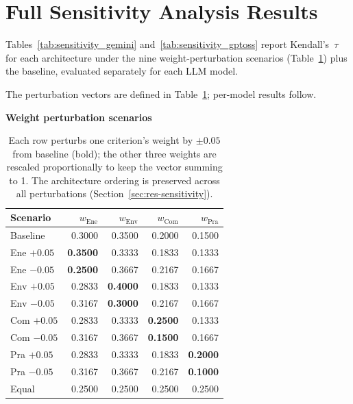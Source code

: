 \documentclass[final,3p,times]{elsarticle}
\begin{document}
\section{Full Sensitivity Analysis Results}
\label{app:sensitivity_full}

Tables~\ref{tab:sensitivity_gemini} and~\ref{tab:sensitivity_gptoss} report
Kendall's~$\tau$ for each architecture under the nine weight-perturbation
scenarios (Table~\ref{tab:sensitivity_weights}) plus the baseline,
evaluated separately for each LLM model.

The perturbation vectors are defined in Table~\ref{tab:sensitivity_weights}; per-model results follow.

\begin{table}[htbp]
\begin{threeparttable}
\centering
\small
\textbf{Weight perturbation scenarios}
\caption{Each row perturbs one criterion's weight by $\pm0.05$ from baseline (bold); the other three weights are rescaled proportionally to keep the vector summing to 1. The architecture ordering is preserved across all perturbations (Section~\ref{sec:res-sensitivity}).}
\label{tab:sensitivity_weights}
\begin{tabular}{@{} l r r r r @{}}
\toprule
\textbf{Scenario} & $w_{\text{Ene}}$ & $w_{\text{Env}}$ & $w_{\text{Com}}$ & $w_{\text{Pra}}$ \\
\midrule
Baseline          & 0.3000 & 0.3500 & 0.2000 & 0.1500 \\
\midrule
Ene $+0.05$       & \textbf{0.3500} & 0.3333  & 0.1833  & 0.1333 \\
Ene $-0.05$       & \textbf{0.2500}  & 0.3667 & 0.2167 & 0.1667 \\
\midrule
Env $+0.05$       & 0.2833  & \textbf{0.4000} & 0.1833  & 0.1333 \\
Env $-0.05$       & 0.3167 & \textbf{0.3000}  & 0.2167 & 0.1667 \\
\midrule
Com $+0.05$       & 0.2833  & 0.3333  & \textbf{0.2500} & 0.1333 \\
Com $-0.05$       & 0.3167 & 0.3667 & \textbf{0.1500}  & 0.1667 \\
\midrule
Pra $+0.05$       & 0.2833  & 0.3333  & 0.1833  & \textbf{0.2000} \\
Pra $-0.05$       & 0.3167 & 0.3667 & 0.2167 & \textbf{0.1000} \\
\midrule
Equal             & 0.2500  & 0.2500  & 0.2500 & 0.2500 \\
\bottomrule
\end{tabular}
\end{threeparttable}
\end{table}
\end{document}
